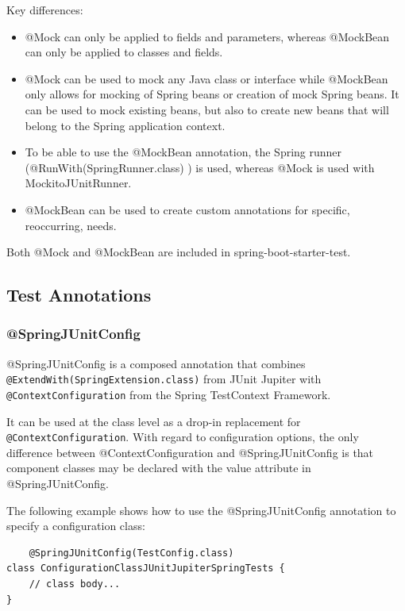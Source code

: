 \documentclass{scrartcl}
\begin{document}
Key differences:

\begin{itemize}
    \item @Mock can only be applied to fields and parameters, whereas @MockBean can only be applied to classes and fields.
    \item @Mock can be used to mock any Java class or interface while @MockBean only allows for mocking of Spring beans or creation of mock Spring beans. It can be used to mock existing beans, but also to create new beans that will belong to the Spring application context.
    \item To be able to use the @MockBean annotation, the Spring runner (@RunWith(SpringRunner.class) ) is used, whereas @Mock is used with MockitoJUnitRunner.
    \item @MockBean can be used to create custom annotations for specific, reoccurring, needs.
\end{itemize}

Both @Mock and @MockBean are included in spring-boot-starter-test.

\subsection{Test Annotations}

\subsubsection{@SpringJUnitConfig}

@SpringJUnitConfig is a composed annotation that combines \lstinline|@ExtendWith(SpringExtension.class)| from JUnit Jupiter with \lstinline|@ContextConfiguration| from the Spring TestContext Framework.

It can be used at the class level as a drop-in replacement for \lstinline|@ContextConfiguration|. With regard to configuration options, the only difference between @ContextConfiguration and @SpringJUnitConfig is that component classes may be declared with the value attribute in @SpringJUnitConfig.

The following example shows how to use the @SpringJUnitConfig annotation to specify a configuration class:

\begin{lstlisting}
    @SpringJUnitConfig(TestConfig.class)
class ConfigurationClassJUnitJupiterSpringTests {
    // class body...
}

\end{lstlisting}
\end{document}
